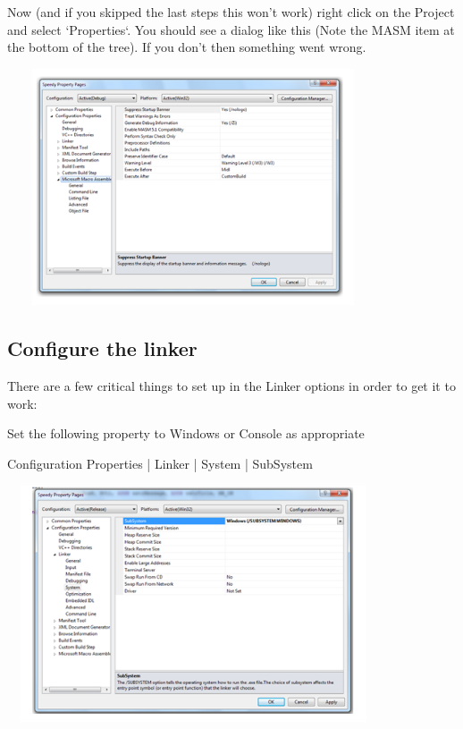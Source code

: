 \documentclass[12pt]{extarticle}
\begin{document}
 Now (and if you skipped the last steps this won’t work) right click on the Project and select ‘Properties‘. You should see a dialog like this (Note the MASM item at the bottom of the tree). If you don’t then something went wrong.

 \begin{center}

    \includegraphics[width=11cm, height=7cm]{yy}
    
 \end{center}

 \subsection{Configure the linker}

 There are a few critical things to set up in the Linker options in order to get it to work:

Set the following property to Windows or Console as appropriate

Configuration Properties | Linker | System | SubSystem

\begin{center}

    \includegraphics[width=11cm, height=7cm]{12}
    
 \end{center}
\end{document}

